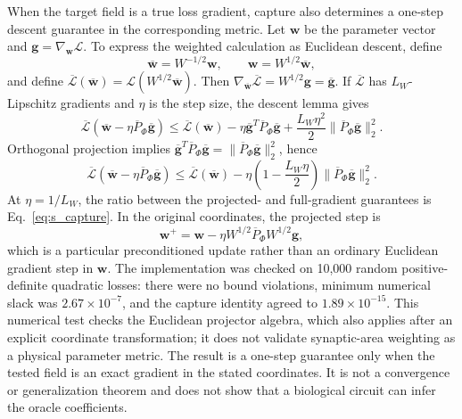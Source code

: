 When the target field is a true loss gradient, capture also determines a
one-step descent guarantee in the corresponding metric. Let $\bm w$ be
the parameter vector and $\bm g=\nabla_{\bm w}\mathcal L$. To express
the weighted calculation as Euclidean descent, define
\begin{equation}
\overline{\bm w}=W^{-1/2}\bm w,
\qquad
\bm w=W^{1/2}\overline{\bm w},
\end{equation}
and define
$\overline{\mathcal L}(\overline{\bm w})=
\mathcal L(W^{1/2}\overline{\bm w})$. Then
$\nabla_{\overline{\bm w}}\overline{\mathcal L}=W^{1/2}\bm g=
\overline{\bm g}$. If $\overline{\mathcal L}$ has $L_W$-Lipschitz gradients
and $\eta$ is the step size, the descent lemma gives
\begin{equation}
\overline{\mathcal L}(\overline{\bm w}-\eta\overline P_\Phi\overline{\bm g})
\leq\overline{\mathcal L}(\overline{\bm w})
-\eta\overline{\bm g}^{T}\overline P_\Phi\overline{\bm g}
+\frac{L_W\eta^2}{2}
\lVert\overline P_\Phi\overline{\bm g}\rVert_2^2.
\end{equation}
Orthogonal projection implies
$\overline{\bm g}^{T}\overline P_\Phi\overline{\bm g}
=\lVert\overline P_\Phi\overline{\bm g}\rVert_2^2$, hence
\begin{equation}
\overline{\mathcal L}(\overline{\bm w}-\eta\overline P_\Phi\overline{\bm g})
\leq\overline{\mathcal L}(\overline{\bm w})
-\eta\left(1-\frac{L_W\eta}{2}\right)
\lVert\overline P_\Phi\overline{\bm g}\rVert_2^2.
\label{eq:s_descent}
\end{equation}
At $\eta=1/L_W$, the ratio between the projected- and full-gradient guarantees
is Eq.~\ref{eq:s_capture}. In the original coordinates, the projected step is
\begin{equation}
\bm w^+=\bm w-\eta W^{1/2}\overline P_\Phi W^{1/2}\bm g,
\end{equation}
which is a particular preconditioned update rather than an ordinary Euclidean
gradient step in $\bm w$. The implementation was checked on 10,000 random
positive-definite quadratic losses: there were no bound violations, minimum
numerical slack was $2.67\times10^{-7}$, and the capture identity agreed to
$1.89\times10^{-15}$. This numerical test checks the Euclidean projector algebra, which
also applies after an explicit coordinate transformation; it does not validate
synaptic-area weighting as a physical parameter metric. The result is a
one-step guarantee only when the tested field is an exact gradient in the
stated coordinates. It is not a convergence or generalization theorem and
does not show that a biological circuit can infer the oracle coefficients.

